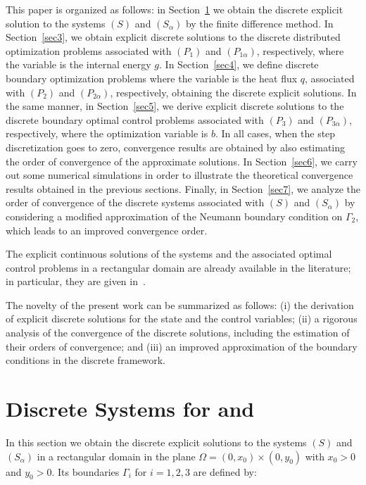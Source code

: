\documentclass[axioms,article,submit,moreauthors]{Definitions/mdpi}
\begin{document}
This paper is organized as follows: in Section~\ref{sec2} we obtain the discrete explicit solution to the systems $(S)$ and $(S_\alpha)$ by the finite difference method. In Section~\ref{sec3}, we obtain explicit discrete solutions to the discrete distributed optimization problems associated with $(P_1)$ and $(P_{1\alpha})$, respectively, where the  variable is the internal energy $g$. 
In Section~\ref{sec4}, we define  discrete boundary optimization problems where the variable is the heat flux $q$, associated with $(P_2)$ and $(P_{2\alpha})$, respectively, obtaining the discrete explicit  solutions. In the same manner, in Section~\ref{sec5}, we derive explicit discrete solutions to the discrete boundary optimal control problems associated with $(P_3)$ and $(P_{3\alpha})$, respectively, where the optimization variable is $b$.  In all cases, when the step discretization goes to zero, convergence results are obtained by also estimating the order of convergence of the approximate solutions.
In Section~\ref{sec6}, we carry out some numerical simulations  in order to illustrate the theoretical convergence results obtained in the previous sections. Finally,  in Section~\ref{sec7}, we analyze the order of convergence of the discrete systems associated with $(S)$ and $(S_\alpha)$ by considering a modified approximation of the Neumann boundary condition on $\Gamma_2$, which leads to an improved convergence order.
 
 
{The explicit continuous solutions of the systems and the associated optimal control problems in a rectangular domain are already available in the literature; in particular, they are given in~\cite{BoGaTa2020}. 

The novelty of the present work can be summarized as follows: 
(i) the derivation of explicit discrete solutions for the state and the control variables; 
(ii) a rigorous analysis of the convergence of the discrete solutions, including the estimation of their orders of convergence; 
and (iii) an improved approximation of the boundary conditions in the discrete framework.}

\section{Discrete Systems for  and }\label{sec2} 

In this section we obtain the discrete explicit solutions to the  systems $(S)$ and $(S_\alpha)$ in a rectangular  domain in the plane  $\Omega = (0, x_0) \times (0, y_0)$ with $x_0>0$ and $y_0 > 0$. Its boundaries $\Gamma_i$ for $i=1,2,3$  are defined by:
\end{document}
